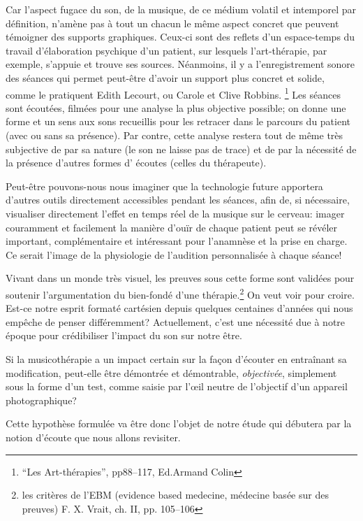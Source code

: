 Car l'aspect fugace du son, de la musique, de ce médium volatil et
intemporel par
définition, n'amène pas à tout un chacun le
même aspect concret que peuvent témoigner des supports
graphiques. Ceux-ci sont des 
reflets d'un espace-temps du travail d'élaboration
psychique d'un patient, sur lesquels l'art-thérapie, par exemple, s'appuie et trouve
ses sources.
Néanmoins, il y a l'enregistrement sonore des séances qui 
permet peut-être d'avoir un support plus concret et solide, comme le pratiquent Edith Lecourt, ou Carole et Clive 
Robbins. \footnote{``Les Art-thérapies'', pp88--117, Ed.Armand Colin}
Les séances sont écoutées, filmées pour une
analyse la plus objective possible; on donne 
une forme et un sens aux sons recueillis pour les retracer dans le
parcours du patient (avec ou sans sa présence). Par contre, cette analyse  restera
tout de même très subjective de par sa nature (le son ne laisse pas
de trace) et de par la nécessité de la présence d'autres formes d'
écoutes (celles du thérapeute).

Peut-être pouvons-nous nous imaginer que la technologie future apportera d'autres outils
directement accessibles pendant les séances, afin
 de, si nécessaire, visualiser directement l'effet en temps réel de la musique sur le
 cerveau:  imager couramment et facilement la manière d'ouïr de chaque
 patient peut se révéler important, complémentaire et intéressant pour
 l'anamnèse et la prise en charge. Ce serait l'image de la
 physiologie de l'audition personnalisée à chaque séance!

 
Vivant dans un monde très visuel, les preuves sous cette forme sont
validées pour soutenir l'argumentation du bien-fondé d'une thérapie.\footnote{
	les critères de l'EBM (evidence based medecine, médecine basée sur des 
        preuves) F. X. Vrait, ch. II, pp. 105--106 }
On veut voir pour croire. Est-ce 
notre esprit formaté cartésien depuis quelques centaines d'années qui nous 
empêche de penser différemment? 
Actuellement, c'est une nécessité due à notre époque pour crédibiliser l'impact 
du son sur notre être.


Si la 
musicothérapie a un impact certain sur la façon d'écouter en
entraînant sa 
modification, peut-elle être  
démontrée et démontrable, \textsl{objectivée},
simplement sous la forme d'un test, comme saisie par 
l'\oe il neutre de l'objectif d'un appareil
photographique?

Cette hypothèse formulée va être donc l'objet de notre étude qui
débutera par la notion d'écoute que nous allons revisiter.
